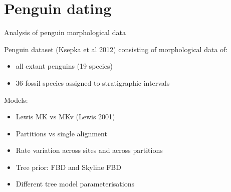 \section{Penguin dating}


\begin{frame}{Analysis of penguin morphological data}

Penguin dataset (Ksepka et al 2012) consisting of morphological data of:
\begin{itemize}
\item all extant penguins (19 species)
\item 36 fossil species assigned to stratigraphic intervals
\end{itemize}

\vskip2mm

Models:

\begin{itemize}
\item Lewis MK vs MKv (Lewis 2001)
\item Partitions vs single alignment
\item Rate variation across sites and across partitions
\item Tree prior: FBD and Skyline FBD
\item Different tree model parameterisations
\end{itemize}


\end{frame}



